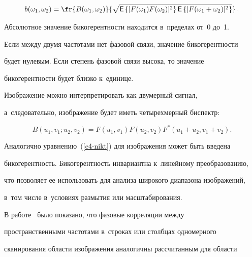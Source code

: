   \begin{equation}


  b(\omega_1,\omega_2) =\fr{B(\omega_1,\omega_2)}{\sqrt{{\sf E}\left\{ \vert 


F(\omega_1) F(\omega_2)\vert^2\right\} {\sf E}\left\{ \vert 


F(\omega_1+\omega_2)\vert^2\right\}}}\,.


  \label{e4-nikt}


  \end{equation}


    Абсолютное значение бикогерентности находится в~пределах от~0 до~1. 


Если меж\-ду двумя частотами нет фазовой связи, значение бикогерентности 


будет нулевым. Если степень фазовой связи высока, то значение 


би\-ко\-ге\-рент\-ности будет близ\-ко к~единице. 


  


  Изображение можно интерпретировать как двумерный сигнал, 


а~следовательно, изображение будет иметь четырехмерный би\-спектр:


  \begin{equation*}


  B\left( u_1, v_1; u_2,v_2\right) =F(u_1,v_1) F(u_2,v_2) F^*(u_1+u_2, v_1+v_2).




  \end{equation*}


  


  Аналогично уравнению~(\ref{e4-nikt}) для изображения может быть введена 


бикогерентность. Бикогерентность инвариантна к~линейному преобразованию, 


что поз\-во\-ля\-ет ее использовать для анализа широкого диапазона изображений, 


в~том числе в~условиях размытия или масштабирования.


  


  В работе~\cite{10-nikt} было показано, что фазовые корреляции между 


пространственными частотами в~строках или столбцах одномерного 


сканирования об\-ласти изображения аналогичны рас\-счи\-тан\-ным для об\-ласти 


